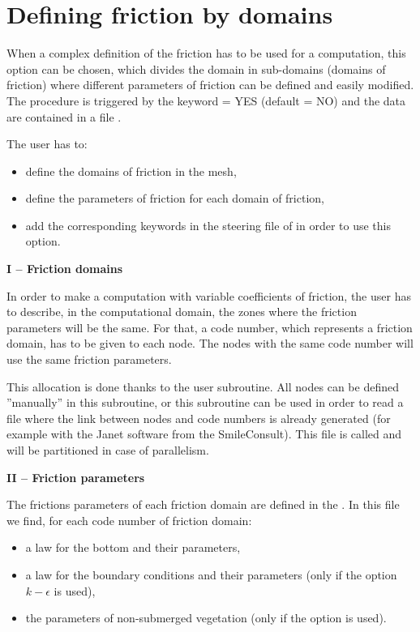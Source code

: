 \chapter{Defining friction by domains}
\label{tel2d:app5}
When a complex definition of the friction has to be used for a computation, this
option can be chosen, which divides the domain in sub-domains (domains of friction)
where different parameters of friction can be defined and easily modified.
The procedure is triggered by the keyword  = YES
(default = NO) and the data are contained in a file .

The user has to:

\begin{itemize}
\item  define the domains of friction in the mesh,

\item  define the parameters of friction for each domain of friction,

\item  add the corresponding keywords in the steering file of 
in order to use this option.
\end{itemize}

\textbf{I -- Friction domains}

In order to make a computation with variable coefficients of friction,
the user has to describe, in the computational domain, the zones where the
friction parameters will be the same.
For that, a code number, which represents a friction domain, has to be given to
each node.
The nodes with the same code number will use the same friction parameters.

This allocation is done thanks to the  user subroutine.
All nodes can be defined ''manually'' in this subroutine, or this subroutine can
be used in order to read a file where the link between nodes and code numbers is
already generated (for example with the Janet software from the SmileConsult).
This file is called  and will be partitioned in case of
parallelism.

\textbf{II -- Friction parameters}

The frictions parameters of each friction domain are defined in the
.
In this file we find, for each code number of friction domain:

\begin{itemize}
\item  a law for the bottom and their parameters,

\item  a law for the boundary conditions and their parameters
(only if the option $k-\epsilon$ is used),

\item  the parameters of non-submerged vegetation (only if the option is used).
\end{itemize}

